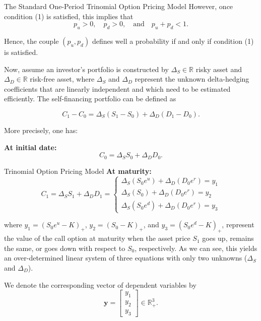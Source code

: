 \documentclass[aspectratio=169,xcolor=dvipsnames]{beamer}
\begin{document}
	\begin{frame}{The Standard One-Period Trinomial Option Pricing Model}
			However, once condition (1) is satisfied, this implies that
		\[
		p_u > 0, \quad p_d > 0, \quad \text{and} \quad p_u + p_d < 1.
		\]
		
		Hence, the couple \( (p_u, p_d) \) defines well a probability if and only if condition (1) is satisfied.
		
		Now, assume an investor’s portfolio is constructed by \( \Delta_S \in \mathbb{R} \) risky asset and \( \Delta_D \in \mathbb{R} \) risk-free asset, where \( \Delta_S \) and \( \Delta_D \) represent the unknown delta-hedging coefficients that are linearly independent and which need to be estimated efficiently. The self-financing portfolio can be defined as
		
		\[
		C_1 - C_0 = \Delta_S (S_1 - S_0) + \Delta_D (D_1 - D_0).
		\]
		
		More precisely, one has:
		
		\vspace{1em}
		\noindent\textbf{At initial date:}
		\[
		C_0 = \Delta_S S_0 + \Delta_D D_0.
		\]
			\end{frame}
	\begin{frame}{Trinomial Option Pricing Model}
	\vspace{1em}
\noindent\textbf{At maturity:}
\[
C_1 = \Delta_S S_1 + \Delta_D D_1= \begin{cases}
	\Delta_S (S_0 e^u) + \Delta_D (D_0 e^r) = y_1 \\
	\Delta_S (S_0) + \Delta_D (D_0 e^r) = y_2 \\
	\Delta_S (S_0 e^d) + \Delta_D (D_0 e^r) = y_3
\end{cases}
\]

where \( y_1 = (S_0 e^u - K)_+ \), \( y_2 = (S_0 - K)_+ \), and \( y_3 = (S_0 e^d - K)_+ \), represent the value of the call option at maturity when the asset price \( S_1 \) goes up, remains the same, or goes down with respect to \( S_0 \), respectively. As we can see, this yields an over-determined linear system of three equations with only two unknowns (\( \Delta_S \) and \( \Delta_D \)).

We denote the corresponding vector of dependent variables by
\[
\mathbf{y} = 
\begin{bmatrix}
	y_1 \\
	y_2 \\
	y_3
\end{bmatrix}
\in \mathbb{R}^3_+.
\]

\end{frame}
\end{document}
